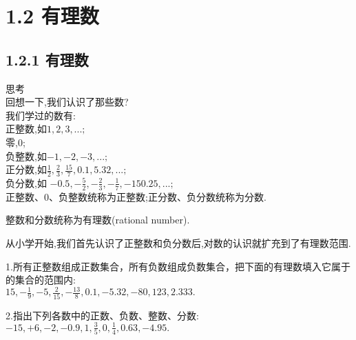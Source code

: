 \documentclass{article}
\begin{document}
	\section*{1.2 有理数}
	\subsection*{1.2.1 有理数}
	思考\\
	\indent 回想一下,我们认识了那些数?\\
	\indent 我们学过的数有:\\
	\indent 正整数,如$1,2,3,...;$\\
	\indent 零,$0$;\\
	\indent 负整数,如$-1,-2,-3,...;$\\
	\indent 正分数,如$\frac{1}{2},\frac{2}{3},\frac{15}{7},0.1,5.32,...;$\\
	\indent 负分数,如 $-0.5,-\frac{5}{2},-\frac{2}{3},-\frac{1}{7},-150.25,...;$\\
	\indent 正整数、0、负整数统称为正整数;正分数、负分数统称为分数.\\
		\begin{definition}
			整数和分数统称为有理数(rational number).\\
		\end{definition}

	\indent 从小学开始,我们首先认识了正整数和负分数后,对数的认识就扩充到了有理数范围.\\
	
		\begin{exercise}
			1.所有正整数组成正数集合，所有负数组成负数集合，把下面的有理数填入它属于的集合的范围内:\\
			\indent $15,-\frac{1}{9},-5,\frac{2}{15},-\frac{13}{8},0.1,-5.32,-80,123,2.333.$\\
			
			
			2.指出下列各数中的正数、负数、整数、分数:\\
			\indent $-15,+6,-2,-0.9,1,\frac{3}{5},0,\frac{1}{4},0.63,-4.95.$\\
		\end{exercise}
	
\end{document}
